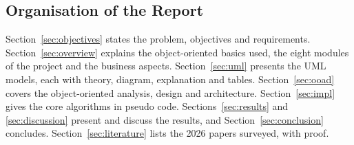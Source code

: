 \subsection{Organisation of the Report}
Section~\ref{sec:objectives} states the problem, objectives and requirements. Section~\ref{sec:overview} explains the object-oriented basics used, the eight modules of the project and the business aspects. Section~\ref{sec:uml} presents the UML models, each with theory, diagram, explanation and tables. Section~\ref{sec:ooad} covers the object-oriented analysis, design and architecture. Section~\ref{sec:impl} gives the core algorithms in pseudo code. Sections~\ref{sec:results} and \ref{sec:discussion} present and discuss the results, and Section~\ref{sec:conclusion} concludes. Section~\ref{sec:literature} lists the 2026 papers surveyed, with proof.
